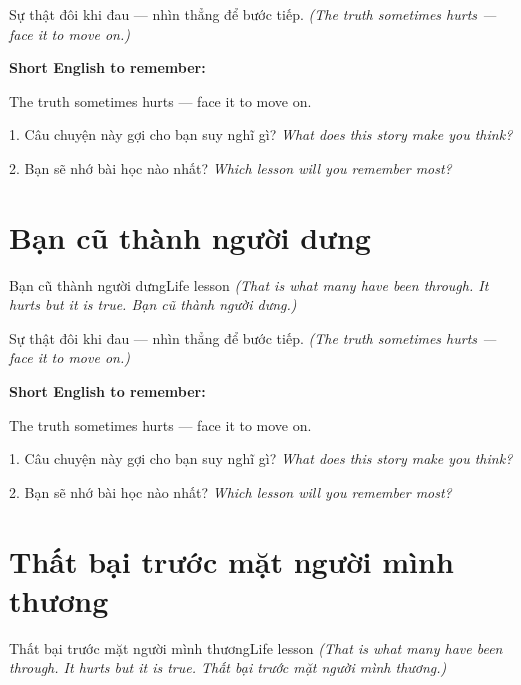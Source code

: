 \begin{baihoc}
Sự thật đôi khi đau — nhìn thẳng để bước tiếp.
\textit{(The truth sometimes hurts — face it to move on.)}
\end{baihoc}

\begin{ghinhoanh}
\textbf{Short English to remember:}

The truth sometimes hurts — face it to move on.

\end{ghinhoanh}

\begin{tuhocnhanh}
1. Câu chuyện này gợi cho bạn suy nghĩ gì? \textit{What does this story make you think?}

2. Bạn sẽ nhớ bài học nào nhất? \textit{Which lesson will you remember most?}
\end{tuhocnhanh}
\ngancach


\section{Bạn cũ thành người dưng}
\begin{truyen}{Bạn cũ thành người dưng}{Life lesson}
\textit{(That is what many have been through. It hurts but it is true. Bạn cũ thành người dưng.)}
\end{truyen}

\begin{baihoc}
Sự thật đôi khi đau — nhìn thẳng để bước tiếp.
\textit{(The truth sometimes hurts — face it to move on.)}
\end{baihoc}

\begin{ghinhoanh}
\textbf{Short English to remember:}

The truth sometimes hurts — face it to move on.

\end{ghinhoanh}

\begin{tuhocnhanh}
1. Câu chuyện này gợi cho bạn suy nghĩ gì? \textit{What does this story make you think?}

2. Bạn sẽ nhớ bài học nào nhất? \textit{Which lesson will you remember most?}
\end{tuhocnhanh}
\ngancach


\section{Thất bại trước mặt người mình thương}
\begin{truyen}{Thất bại trước mặt người mình thương}{Life lesson}
\textit{(That is what many have been through. It hurts but it is true. Thất bại trước mặt người mình thương.)}
\end{truyen}


